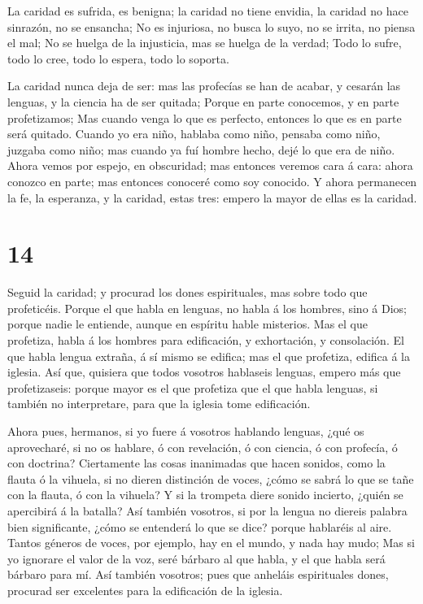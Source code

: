  La caridad es sufrida, es benigna; la caridad no tiene
envidia, la caridad no hace sinrazón, no se ensancha;  No es
injuriosa, no busca lo suyo, no se irrita, no piensa el mal;
 No se huelga de la injusticia, mas se huelga de la verdad;
 Todo lo sufre, todo lo cree, todo lo espera, todo lo
soporta.

 La caridad nunca deja de ser: mas las profecías se han de
acabar, y cesarán las lenguas, y la ciencia ha de ser quitada;
 Porque en parte conocemos, y en parte profetizamos;
 Mas cuando venga lo que es perfecto, entonces lo que es en
parte será quitado.  Cuando yo era niño, hablaba como niño,
pensaba como niño, juzgaba como niño; mas cuando ya fuí hombre hecho,
dejé lo que era de niño.  Ahora vemos por espejo, en
obscuridad; mas entonces veremos cara á cara: ahora conozco en parte;
mas entonces conoceré como soy conocido.  Y ahora
permanecen la fe, la esperanza, y la caridad, estas tres: empero la
mayor de ellas es la caridad.

\hypertarget{section-13}{%
\section{14}\label{section-13}}

 Seguid la caridad; y procurad los dones espirituales, mas
sobre todo que profeticéis.  Porque el que habla en lenguas,
no habla á los hombres, sino á Dios; porque nadie le entiende, aunque en
espíritu hable misterios.  Mas el que profetiza, habla á los
hombres para edificación, y exhortación, y consolación.  El
que habla lengua extraña, á sí mismo se edifica; mas el que profetiza,
edifica á la iglesia.  Así que, quisiera que todos vosotros
hablaseis lenguas, empero más que profetizaseis: porque mayor es el que
profetiza que el que habla lenguas, si también no interpretare, para que
la iglesia tome edificación.

 Ahora pues, hermanos, si yo fuere á vosotros hablando
lenguas, ¿qué os aprovecharé, si no os hablare, ó con revelación, ó con
ciencia, ó con profecía, ó con doctrina?  Ciertamente las
cosas inanimadas que hacen sonidos, como la flauta ó la vihuela, si no
dieren distinción de voces, ¿cómo se sabrá lo que se tañe con la flauta,
ó con la vihuela?  Y si la trompeta diere sonido incierto,
¿quién se apercibirá á la batalla?  Así también vosotros, si
por la lengua no diereis palabra bien significante, ¿cómo se entenderá
lo que se dice? porque hablaréis al aire.  Tantos géneros
de voces, por ejemplo, hay en el mundo, y nada hay mudo; 
Mas si yo ignorare el valor de la voz, seré bárbaro al que habla, y el
que habla será bárbaro para mí.  Así también vosotros; pues
que anheláis espirituales dones, procurad ser excelentes para la
edificación de la iglesia.

